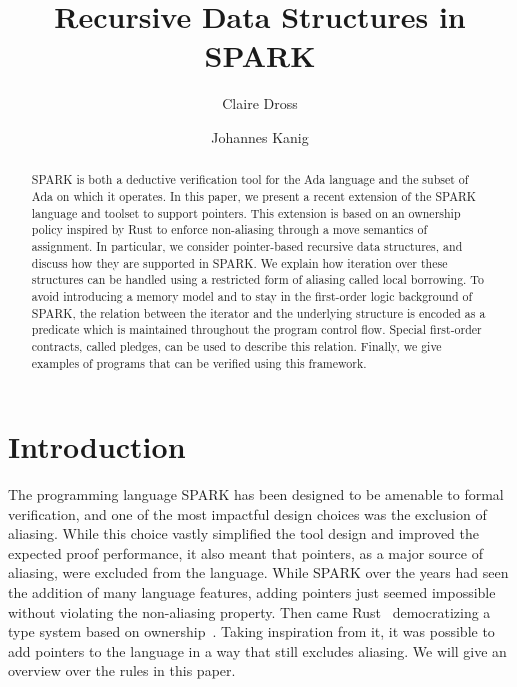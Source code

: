 \documentclass[runningheads]{llncs}
\begin{document}
%
\title{Recursive Data Structures in SPARK}
%
\author{Claire Dross \and Johannes Kanig}
%
%
%
\maketitle              %
%
\begin{abstract}
SPARK is both a deductive verification tool for the Ada language and the subset of Ada on which it operates. In this paper, we present a recent extension of the SPARK language and toolset to support pointers. This extension is based on an ownership policy inspired by Rust to enforce non-aliasing through a move semantics of assignment. In particular, we consider pointer-based recursive data structures, and discuss how they are supported in SPARK. We explain how iteration over these structures can be handled using a restricted form of aliasing called local borrowing. To avoid introducing a memory model and to stay in the first-order logic background of SPARK, the relation between the iterator and the underlying structure is encoded as a predicate which is maintained throughout the program control flow. Special first-order contracts, called pledges, can be used to describe this relation. Finally, we give examples of programs that can be verified using this framework.

\end{abstract}
%
%
%
\section{Introduction}
The programming language SPARK has been designed to be amenable to formal verification, and one of the most impactful design choices was the exclusion of aliasing. While this choice vastly simplified the tool design and improved the expected proof performance, it also meant that pointers, as a major source of aliasing, were excluded from the language. While SPARK over the years had seen the addition of many language features, adding pointers just seemed impossible without violating the non-aliasing property. %
Then came Rust~\cite{rust} democratizing a type system based on ownership~\cite{clarke1998ownership}. %
Taking inspiration from it, it was possible to add pointers to the language in a way that still excludes aliasing.
We will give an overview over the rules in this paper.
\end{document}
